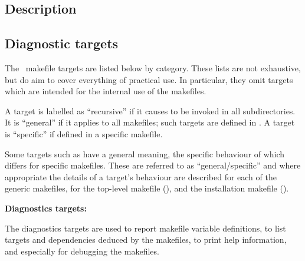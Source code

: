 \subsection*{Description}


\subsection*{Diagnostic targets}

The \aipspp\ makefile targets are listed below by category.  These lists
are not exhaustive, but do aim to cover everything of practical use.  In
particular, they omit targets which are intended for the internal use of the
makefiles.

A target is labelled as ``recursive'' if it causes  to be
invoked in all subdirectories.  It is ``general'' if it applies to all
makefiles; such targets are defined in .  A target is
``specific'' if defined in a specific makefile.

Some targets such as  have a general meaning, the specific
behaviour of which differs for specific makefiles.  These are referred to as
``general/specific'' and where appropriate the details of a target's behaviour
are described for each of the generic makefiles, for the top-level makefile
(), and the installation makefile ().

\textbf{Diagnostics targets:}

The diagnostics targets are used to report makefile variable definitions, to
list targets and dependencies deduced by the makefiles, to print help
information, and especially for debugging the makefiles.

